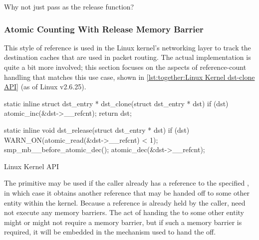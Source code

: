 \QuickQuiz{}
	Why not just pass  as the release function?
 \QuickQuizEnd

\subsubsection{Atomic Counting With Release Memory Barrier}
\label{sec:together:Atomic Counting With Release Memory Barrier}

This style of reference is used in the Linux kernel's networking
layer to track the destination caches that are used in packet routing.
The actual implementation is quite a bit more involved; this section
focuses on the aspects of  reference-count
handling that matches this use case,
shown in \cref{lst:together:Linux Kernel dst-clone API}
(as of Linux v2.6.25).

\begin{listing}[tbp]
\begin{linelabel}
\begin{VerbatimL}[commandchars=\\\[\]]
static inline
struct dst_entry * dst_clone(struct dst_entry * dst)
{
	if (dst)
		atomic_inc(&dst->__refcnt);
	return dst;
}

static inline
void dst_release(struct dst_entry * dst)
{
	if (dst) {
		WARN_ON(atomic_read(&dst->__refcnt) < 1);
		smp_mb__before_atomic_dec();		\lnlbl[mb]
		atomic_dec(&dst->__refcnt);
	}
}
\end{VerbatimL}
\end{linelabel}
\caption{Linux Kernel  API}
\label{lst:together:Linux Kernel dst-clone API}
\end{listing}

The  primitive may be used if the caller
already has a reference to the specified ,
in which case it obtains another reference that may be handed off
to some other entity within the kernel.
Because a reference is already held by the caller, 
need not execute any memory barriers.
The act of handing the  to some other entity might
or might not require a memory barrier, but if such a memory barrier
is required, it will be embedded in the mechanism used to hand the
 off.

